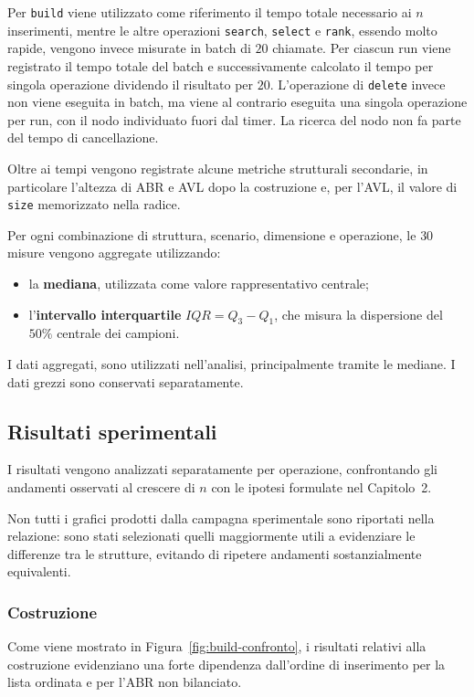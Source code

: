 \documentclass[a4paper,11pt]{article}
\begin{document}
Per \texttt{build} viene utilizzato come riferimento il tempo totale necessario ai $n$ inserimenti, mentre le altre operazioni \texttt{search}, \texttt{select} e \texttt{rank}, essendo molto rapide, vengono invece misurate in batch di $20$ chiamate. Per ciascun run viene registrato il tempo totale del batch e successivamente calcolato il tempo per singola operazione dividendo il risultato per $20$. L'operazione di \texttt{delete} invece non viene eseguita in batch, ma viene al contrario eseguita una singola operazione per run, con il nodo individuato fuori dal timer. La ricerca del nodo non fa parte del tempo di cancellazione. 

Oltre ai tempi vengono registrate alcune metriche strutturali secondarie, in particolare l'altezza di ABR e AVL dopo la costruzione e, per l'AVL, il valore di \texttt{size} memorizzato nella radice.

Per ogni combinazione di struttura, scenario, dimensione e operazione, le $30$ misure vengono aggregate utilizzando:

\begin{itemize}
    \item la \textbf{mediana}, utilizzata come valore rappresentativo centrale;
    
    \item l'\textbf{intervallo interquartile} $IQR = Q_3-Q_1$, che misura la dispersione del $50\%$ centrale dei campioni.
\end{itemize}

I dati aggregati, sono utilizzati nell'analisi, principalmente tramite le mediane. I dati grezzi sono conservati separatamente.


\subsection{Risultati sperimentali}
I risultati vengono analizzati separatamente per operazione, confrontando gli andamenti osservati al crescere di $n$ con le ipotesi formulate nel Capitolo~2.

Non tutti i grafici prodotti dalla campagna sperimentale sono riportati nella relazione: sono stati selezionati quelli maggiormente utili a evidenziare le differenze tra le strutture, evitando di ripetere andamenti sostanzialmente equivalenti.


\subsubsection{Costruzione} 
Come viene mostrato in Figura~\ref{fig:build-confronto}, i risultati relativi alla costruzione evidenziano una forte dipendenza dall'ordine di inserimento per la lista ordinata e per l'ABR non bilanciato.
\end{document}
